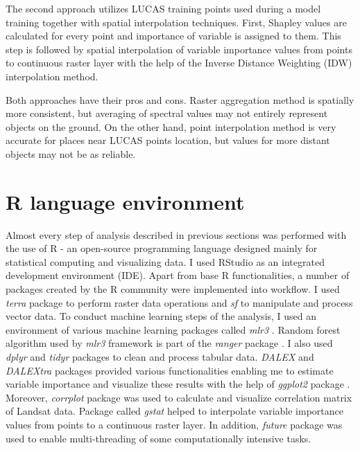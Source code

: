\documentclass{amuthesis}
\begin{document}
The second approach utilizes LUCAS training points used during a model
training together with spatial interpolation techniques. First, Shapley
values are calculated for every point and importance of variable is
assigned to them. This step is followed by spatial interpolation of
variable importance values from points to continuous raster layer with
the help of the Inverse Distance Weighting (IDW) interpolation method.

Both approaches have their pros and cons. Raster aggregation method is
spatially more consistent, but averaging of spectral values may not
entirely represent objects on the ground. On the other hand, point
interpolation method is very accurate for places near LUCAS points
location, but values for more distant objects may not be as reliable.

\hypertarget{sec-r}{%
\section{R language environment}\label{sec-r}}

Almost every step of analysis described in previous sections was
performed with the use of R \autocite{R-base} - an open-source
programming language designed mainly for statistical computing and
visualizing data. I used RStudio \autocite{rstudio_team_rstudio_2020} as
an integrated development environment (IDE). Apart from base R
functionalities, a number of packages created by the R community were
implemented into workflow. I used \emph{terra} package
\autocite{R-terra} to perform raster data operations and \emph{sf}
\autocite{R-sf} to manipulate and process vector data. To conduct
machine learning steps of the analysis, I used an environment of various
machine learning packages called \emph{mlr3} \autocite{R-mlr3}. Random
forest algorithm used by \emph{mlr3} framework is part of the
\emph{ranger} package \autocite{R-ranger}. I also used \emph{dplyr}
\autocite{R-dplyr} and \emph{tidyr} packages \autocite{R-tidyr} to clean
and process tabular data. \emph{DALEX} \autocite{R-DALEX} and
\emph{DALEXtra} \autocite{R-DALEXtra} packages provided various
functionalities enabling me to estimate variable importance and
visualize these results with the help of \emph{ggplot2} package
\autocite{R-ggplot2}. Moreover, \emph{corrplot} package was used to
calculate and visualize correlation matrix of Landsat data. Package
called \emph{gstat} \autocite{R-gstat} helped to interpolate variable
importance values from points to a continuous raster layer. In addition,
\emph{future} package \autocite{R-future} was used to enable
multi-threading of some computationally intensive tasks.
\end{document}
